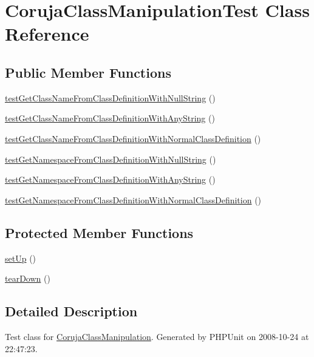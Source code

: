 \hypertarget{class_coruja_class_manipulation_test}{
\section{CorujaClassManipulationTest Class Reference}
\label{class_coruja_class_manipulation_test}
}
\subsection*{Public Member Functions}
\begin{CompactItemize}
\item 
\hyperlink{class_coruja_class_manipulation_test_cf31c2bf27f0eb9c156d709faae15866}{testGetClassNameFromClassDefinitionWithNullString} ()
\item 
\hyperlink{class_coruja_class_manipulation_test_796ba61d6460c6e55138f1a683f17899}{testGetClassNameFromClassDefinitionWithAnyString} ()
\item 
\hyperlink{class_coruja_class_manipulation_test_f19b18a638ca93d790998e4641a03f5c}{testGetClassNameFromClassDefinitionWithNormalClassDefinition} ()
\item 
\hyperlink{class_coruja_class_manipulation_test_e7c02c14ae225332ea595bb2b5466ad8}{testGetNamespaceFromClassDefinitionWithNullString} ()
\item 
\hyperlink{class_coruja_class_manipulation_test_b6590619b10123f5b485b45210d3092a}{testGetNamespaceFromClassDefinitionWithAnyString} ()
\item 
\hyperlink{class_coruja_class_manipulation_test_cac851e4a7cb237758fa7a9522c1f1c7}{testGetNamespaceFromClassDefinitionWithNormalClassDefinition} ()
\end{CompactItemize}
\subsection*{Protected Member Functions}
\begin{CompactItemize}
\item 
\hyperlink{class_coruja_class_manipulation_test_0bc688732d2b3b162ffebaf7812e78da}{setUp} ()
\item 
\hyperlink{class_coruja_class_manipulation_test_80fe3d17e658907fc75346a0ec9d6fc7}{tearDown} ()
\end{CompactItemize}


\subsection{Detailed Description}
Test class for \hyperlink{class_coruja_class_manipulation}{CorujaClassManipulation}. Generated by PHPUnit on 2008-10-24 at 22:47:23. 

